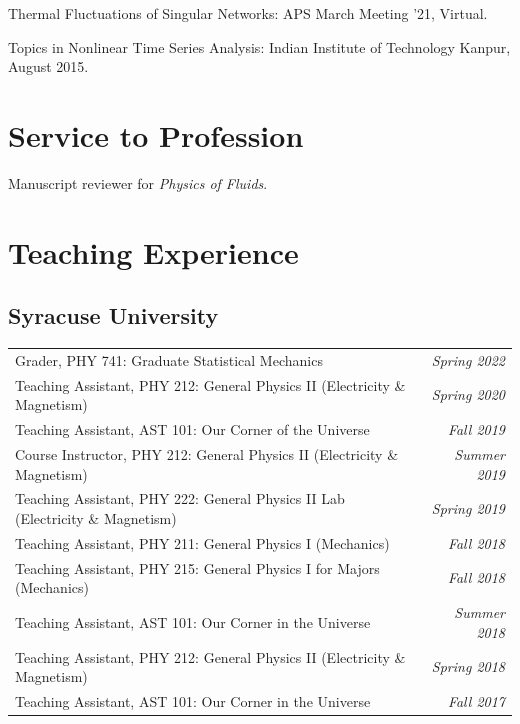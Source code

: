 \documentclass[10pt,a4paper,article,oneside]{memoir}
\def\nohangpars{%
  \leftskip=0pt%
  \parindent=0pt%
  \setsecindent{0pt}%
  \setsubsecindent{0pt}%
}
\begin{document}
Thermal Fluctuations of Singular Networks: APS March Meeting '21, Virtual.

Topics in Nonlinear Time Series Analysis: Indian Institute of Technology Kanpur, August 2015.


\nohangpars

\section{Service to Profession}

Manuscript reviewer for \emph{Physics of Fluids}.


\section{Teaching Experience}

\subsection{Syracuse University}


\begin{tabular}{@{}lr}
  Grader, PHY 741: Graduate Statistical Mechanics                                              & \emph{Spring 2022} \\
  Teaching Assistant, PHY 212: General Physics II (Electricity \& Magnetism)                   & \emph{Spring 2020} \\
  Teaching Assistant, AST 101: Our Corner of the Universe                                      & \emph{Fall 2019}   \\
  Course Instructor, PHY 212: General Physics II (Electricity \& Magnetism)                    & \emph{Summer 2019} \\
  Teaching Assistant, PHY 222: General Physics II Lab (Electricity \& Magnetism)               & \emph{Spring 2019} \\
  Teaching Assistant, PHY 211: General Physics I (Mechanics)                                   & \emph{Fall 2018}   \\
  Teaching Assistant, PHY 215: General Physics I for Majors (Mechanics)                        & \emph{Fall 2018}   \\
  Teaching Assistant, AST 101: Our Corner in the Universe                                      & \emph{Summer 2018} \\
  Teaching Assistant, PHY 212: General Physics II (Electricity \& Magnetism)                   & \emph{Spring 2018} \\
  Teaching Assistant, AST 101: Our Corner in the Universe                                      & \emph{Fall 2017}
\end{tabular}
\end{document}
